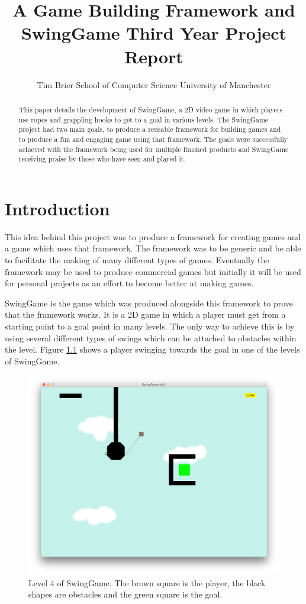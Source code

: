 \documentclass[]{report}
\title{
	A Game Building Framework and SwingGame\endgraf
	Third Year Project Report
}
\author{
	\parbox{\linewidth}{
		\centering%
		Tim Brier\endgraf
		School of Computer Science\endgraf
		University of Manchester
	}
}
\date{
	\parbox{\linewidth}{
		\centering%
		April 2015\endgraf\bigskip
		Supervised by Dr Steve Pettifer
	}
}
\begin{document}
\maketitle

\begin{abstract}
This paper details the development of SwingGame, a 2D video game in which players use ropes and grappling hooks to get to a goal in various levels.  The SwingGame project had two main goals, to produce a reusable framework for building games and to produce a fun and engaging game using that framework. The goals were successfully achieved with the framework being used for multiple finished products and SwingGame receiving praise by those who have seen and played it.
\end{abstract}

\tableofcontents

\chapter{Introduction}
This idea behind this project was to produce a framework for creating games and a game which uses that framework. The framework was to be generic and be able to facilitate the making of many different types of games. Eventually the framework may be used to produce commercial games but initially it will be used for personal projects as an effort to become better at making games.

SwingGame is the game which was produced alongside this framework to prove that the framework works. It is a 2D game in which a player must get from a starting point to a goal point in many levels. The only way to achieve this is by using several different types of swings which can be attached to obstacles within the level. Figure \ref{sgexample} shows a player swinging towards the goal in one of the levels of SwingGame.

\begin{figure}[H]
	\centering
	\includegraphics[scale=0.25]{sgexample}
	\caption{Level 4 of SwingGame. The brown square is the player, the black shapes are obstacles and the green square is the goal.}
	\label{sgexample}
\end{figure}
\end{document}
